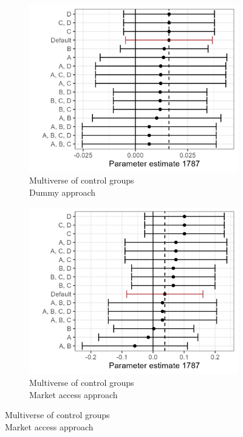 \begin{figure}[H]
    \centering
    \caption{Multiverse of the effect in different comparison groups and parameter choices}
    \begin{subfigure}[b]{0.45\textwidth}
        \centering
        \caption{\label{fig:mult1} Multiverse of control groups\\Dummy approach}
        \includegraphics[width=\textwidth]{Plots/Regression_plots/Multiverse_dummy_1787.png}
    \end{subfigure}
    \hfill
    \begin{subfigure}[b]{0.45\textwidth}
        \centering
        \caption{\label{fig:mult2} Multiverse of control groups\\Market access approach}
        \includegraphics[width=\textwidth]{Plots/Regression_plots/Multiverse_MA_1787.png}

\end{subfigure}
\end{figure}

